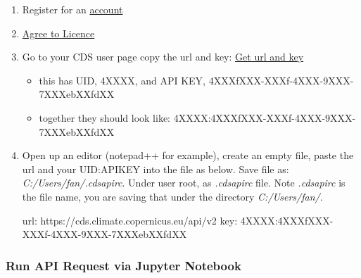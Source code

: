 \documentclass[
]{book}
\newenvironment{Shaded}{\begin{snugshade}}{\end{snugshade}}
\newcommand{\ExtensionTok}[1]{#1}
\newcommand{\NormalTok}[1]{#1}
\providecommand{\tightlist}{%
  \setlength{\itemsep}{0pt}\setlength{\parskip}{0pt}}
\begin{document}
\begin{enumerate}
\def\labelenumi{\arabic{enumi}.}
\item
  Register for an \href{cds.climate.copernicus.eu}{account}
\item
  \href{https://cds.climate.copernicus.eu/cdsapp/\#!/terms/licence-to-use-copernicus-products}{Agree to Licence}
\item
  Go to your CDS user page copy the url and key: \href{https://cds.climate.copernicus.eu/user}{Get url and key}

  \begin{itemize}
  \tightlist
  \item
    this has UID, 4XXXX, and API KEY, 4XXXfXXX-XXXf-4XXX-9XXX-7XXXebXXfdXX
  \item
    together they should look like: 4XXXX:4XXXfXXX-XXXf-4XXX-9XXX-7XXXebXXfdXX
  \end{itemize}
\item
  Open up an editor (notepad++ for example), create an empty file, paste the url and your UID:APIKEY into the file as below. Save file as: \emph{C:/Users/fan/.cdsapirc}. Under user root, as \emph{.cdsapirc} file. Note \emph{.cdsapirc} is the file name, you are saving that under the directory \emph{C:/Users/fan/}.

\begin{Shaded}
\begin{Highlighting}[]
\ExtensionTok{url}\NormalTok{: https://cds.climate.copernicus.eu/api/v2}
\ExtensionTok{key}\NormalTok{: 4XXXX:4XXXfXXX-XXXf-4XXX-9XXX-7XXXebXXfdXX}
\end{Highlighting}
\end{Shaded}
\end{enumerate}

\hypertarget{run-api-request-via-jupyter-notebook}{%
\subsubsection{Run API Request via Jupyter Notebook}\label{run-api-request-via-jupyter-notebook}}
\end{document}
